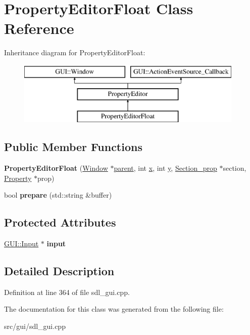\hypertarget{classPropertyEditorFloat}{\section{Property\-Editor\-Float Class Reference}
\label{classPropertyEditorFloat}
}
Inheritance diagram for Property\-Editor\-Float\-:\begin{figure}[H]
\begin{center}
\leavevmode
\includegraphics[height=3.000000cm]{classPropertyEditorFloat}
\end{center}
\end{figure}
\subsection*{Public Member Functions}
\begin{DoxyCompactItemize}
\item 
\hypertarget{classPropertyEditorFloat_a802ab5b49e83b39a3bafd825f7423f6f}{{\bfseries Property\-Editor\-Float} (\hyperlink{classGUI_1_1Window_ae828e9daa964dfc65a3550fb03117d30}{Window} $\ast$\hyperlink{classGUI_1_1Window_a2e593ff65e7702178d82fe9010a0b539}{parent}, int \hyperlink{classGUI_1_1Window_a6ca6a80ca00c9e1d8ceea8d3d99a657d}{x}, int \hyperlink{classGUI_1_1Window_a0ee8e923aff2c3661fc2e17656d37adf}{y}, \hyperlink{classSection__prop}{Section\-\_\-prop} $\ast$section, \hyperlink{classProperty}{Property} $\ast$prop)}\label{classPropertyEditorFloat_a802ab5b49e83b39a3bafd825f7423f6f}

\item 
\hypertarget{classPropertyEditorFloat_adbc9db52bdfd97df5ec2f62d3a59db87}{bool {\bfseries prepare} (std\-::string \&buffer)}\label{classPropertyEditorFloat_adbc9db52bdfd97df5ec2f62d3a59db87}

\end{DoxyCompactItemize}
\subsection*{Protected Attributes}
\begin{DoxyCompactItemize}
\item 
\hypertarget{classPropertyEditorFloat_a84a33b96ef3bd08106b7ab4aa8ef7039}{\hyperlink{classGUI_1_1Input}{G\-U\-I\-::\-Input} $\ast$ {\bfseries input}}\label{classPropertyEditorFloat_a84a33b96ef3bd08106b7ab4aa8ef7039}

\end{DoxyCompactItemize}


\subsection{Detailed Description}


Definition at line 364 of file sdl\-\_\-gui.\-cpp.



The documentation for this class was generated from the following file\-:\begin{DoxyCompactItemize}
\item 
src/gui/sdl\-\_\-gui.\-cpp\end{DoxyCompactItemize}
